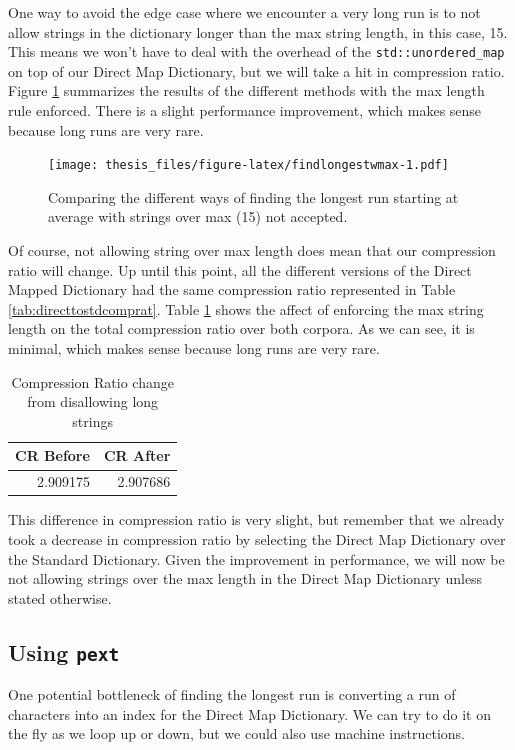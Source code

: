 \documentclass[12pt,twoside]{reedthesis}
\begin{document}
One way to avoid the edge case where we encounter a very long run is to not allow strings in the dictionary longer than the max string length, in this case, 15. This means we won't have to deal with the overhead of the \texttt{std::unordered\_map} on top of our Direct Map Dictionary, but we will take a hit in compression ratio. Figure \ref{fig:findlongestwmax} summarizes the results of the different methods with the max length rule enforced. There is a slight performance improvement, which makes sense because long runs are very rare.
\begin{figure}
\centering
\texttt{[image: thesis\_files/figure-latex/findlongestwmax-1.pdf]}
\caption{\label{fig:findlongestwmax}Comparing the different ways of finding the longest run starting at average with strings over max (15) not accepted.}
\end{figure}
Of course, not allowing string over max length does mean that our compression ratio will change. Up until this point, all the different versions of the Direct Mapped Dictionary had the same compression ratio represented in Table \ref{tab:directtostdcomprat}. Table \ref{tab:maxenforcedstats} shows the affect of enforcing the max string length on the total compression ratio over both corpora. As we can see, it is minimal, which makes sense because long runs are very rare.
\begin{table}

\caption{\label{tab:maxenforcedstats}Compression Ratio change from disallowing long strings}
\centering
\begin{tabular}[t]{rr}
\toprule
CR Before & CR After\\
\midrule
2.909175 & 2.907686\\
\bottomrule
\end{tabular}
\end{table}
This difference in compression ratio is very slight, but remember that we already took a decrease in compression ratio by selecting the Direct Map Dictionary over the Standard Dictionary. Given the improvement in performance, we will now be not allowing strings over the max length in the Direct Map Dictionary unless stated otherwise.

\hypertarget{using-pext}{%
\subsection{\texorpdfstring{Using \texttt{pext}}{Using pext}}\label{using-pext}}

One potential bottleneck of finding the longest run is converting a run of characters into an index for the Direct Map Dictionary. We can try to do it on the fly as we loop up or down, but we could also use machine instructions.
\end{document}
